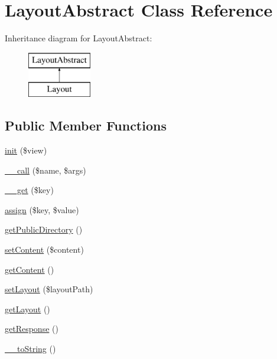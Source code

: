 \hypertarget{class_anemo_1_1_layout_1_1_layout_abstract}{
\section{LayoutAbstract Class Reference}
\label{class_anemo_1_1_layout_1_1_layout_abstract}
}
Inheritance diagram for LayoutAbstract:\begin{figure}[H]
\begin{center}
\leavevmode
\includegraphics[height=2.000000cm]{class_anemo_1_1_layout_1_1_layout_abstract}
\end{center}
\end{figure}
\subsection*{Public Member Functions}
\begin{DoxyCompactItemize}
\item 
\hyperlink{class_anemo_1_1_layout_1_1_layout_abstract_ae1df4c5075648a2e07aed057d8787f92}{init} (\$view)
\item 
\hyperlink{class_anemo_1_1_layout_1_1_layout_abstract_af231e86ad32039b9573ae228db5a29fa}{\_\-\_\-call} (\$name, \$args)
\item 
\hyperlink{class_anemo_1_1_layout_1_1_layout_abstract_a4537dad3b44254124991341cc91b28fb}{\_\-\_\-get} (\$key)
\item 
\hyperlink{class_anemo_1_1_layout_1_1_layout_abstract_a4aa62b003ad9bade1760bb1f729a9cf0}{assign} (\$key, \$value)
\item 
\hyperlink{class_anemo_1_1_layout_1_1_layout_abstract_a2b499b838eaae57e7d79a0619336d93f}{getPublicDirectory} ()
\item 
\hyperlink{class_anemo_1_1_layout_1_1_layout_abstract_a04a5eddb7c3abc7bf31fa25b58f046bf}{setContent} (\$content)
\item 
\hyperlink{class_anemo_1_1_layout_1_1_layout_abstract_a58e43f09a06ce4e29b192c4e17ce7915}{getContent} ()
\item 
\hyperlink{class_anemo_1_1_layout_1_1_layout_abstract_a924a0224f8b36a2eae556458facc3b3f}{setLayout} (\$layoutPath)
\item 
\hyperlink{class_anemo_1_1_layout_1_1_layout_abstract_a5c316721766e9cd8ad5d0085e64048ed}{getLayout} ()
\item 
\hyperlink{class_anemo_1_1_layout_1_1_layout_abstract_a6c907e8af775e517a77037dd0164222f}{getResponse} ()
\item 
\hyperlink{class_anemo_1_1_layout_1_1_layout_abstract_a7516ca30af0db3cdbf9a7739b48ce91d}{\_\-\_\-toString} ()
\end{DoxyCompactItemize}
